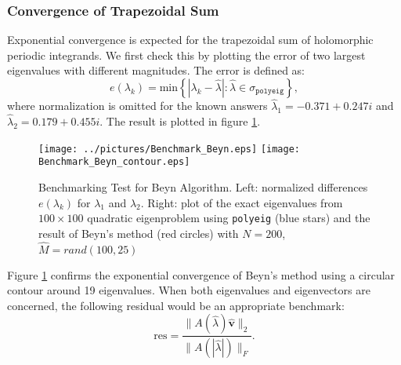 \documentclass[11pt,letterpaper]{article}
\begin{document}
\subsubsection{Convergence of Trapezoidal Sum}
Exponential convergence is expected for the trapezoidal sum of holomorphic periodic integrands. We first check this by plotting the error of two largest eigenvalues with different magnitudes. The error is defined as: 
\begin{equation}
\label{eq:e}
e(\lambda_k) = \mathrm{min}\left\lbrace  |\lambda_k - \hat{\lambda}|:\hat{\lambda}\in\sigma_{\mathtt{polyeig}}\right\rbrace ,
\end{equation}
where normalization is omitted for the known answers  $\hat{\lambda}_1 = -0.371 + 0.247i$ and $\hat{\lambda}_2=
  0.179 + 0.455i$. The result is plotted in figure \ref{fig:Benchmark_Beyn}. 
\begin{figure}\label{fig:Benchmark_Beyn}
\begin{center}
\texttt{[image: ../pictures/Benchmark\_Beyn.eps]}
\texttt{[image: Benchmark\_Beyn\_contour.eps]}
\end{center}
\caption{Benchmarking Test for Beyn Algorithm. \textnormal{Left: normalized differences $e(\lambda_k)$ for $\lambda_1$ and $\lambda_2$. Right: plot of the exact eigenvalues from $100\times100$ quadratic eigenproblem using {\tt polyeig} (blue stars) and the result of Beyn's method (red circles) with $N=200$, $\hat{M}=rand(100,25)$}}
\end{figure}
Figure \ref{fig:Benchmark_Beyn} confirms the exponential convergence of Beyn's method using a circular contour around 19 eigenvalues. When both eigenvalues and eigenvectors are concerned, the following residual would be an appropriate benchmark:
\begin{equation}
\label{eq:Residual}
\mathrm{res}=\frac{\| A(\hat{\lambda})\mathbf{\hat{v}} \|_2 }{\|A(|\hat{\lambda}|) \|_F}.
\end{equation}

\end{document}
